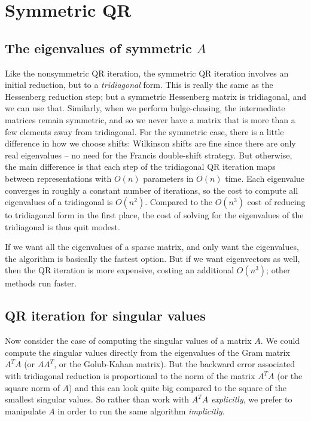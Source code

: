 \section{Symmetric QR}

\subsection{The eigenvalues of symmetric $A$}

Like the nonsymmetric QR iteration, the symmetric QR iteration involves
an initial reduction, but to a {\em tridiagonal} form.  This is really
the same as the Hessenberg reduction step; but a symmetric Hessenberg
matrix is tridiagonal, and we can use that.  Similarly, when we perform
bulge-chasing, the intermediate matrices remain symmetric, and so we
never have a matrix that is more than a few elements away from
tridiagonal.  For the symmetric case, there is a little difference in
how we choose shifts: Wilkinson shifts are fine since there are only
real eigenvalues -- no need for the Francis double-shift strategy. But
otherwise, the main difference is that each step of the tridiagonal QR
iteration maps between representations with $O(n)$ parameters in $O(n)$
time.  Each eigenvalue converges in roughly a constant number of
iterations, so the cost to compute all eigenvalues of a tridiagonal is
$O(n^2)$.  Compared to the $O(n^3)$ cost of reducing to tridiagonal form
in the first place, the cost of solving for the eigenvalues of the
tridiagonal is thus quit modest.

If we want all the eigenvalues of a sparse matrix, and only want the
eigenvalues, the algorithm is basically the fastest option. But if we
want eigenvectors as well, then the QR iteration is more expensive,
costing an additional $O(n^3)$; other methods run faster.

\subsection{QR iteration for singular values}

Now consider the case of computing the singular values of a matrix $A$.
We could compute the singular values directly from the eigenvalues of
the Gram matrix $A^T A$ (or $AA^T$, or the Golub-Kahan matrix).  But
the backward error associated with tridiagonal reduction is proportional
to the norm of the matrix $A^T A$ (or the square norm of $A$) and this
can look quite big compared to the square of the smallest singular values.
So rather than work with $A^T A$ {\em explicitly}, we prefer to manipulate
$A$ in order to run the same algorithm {\em implicitly}.

